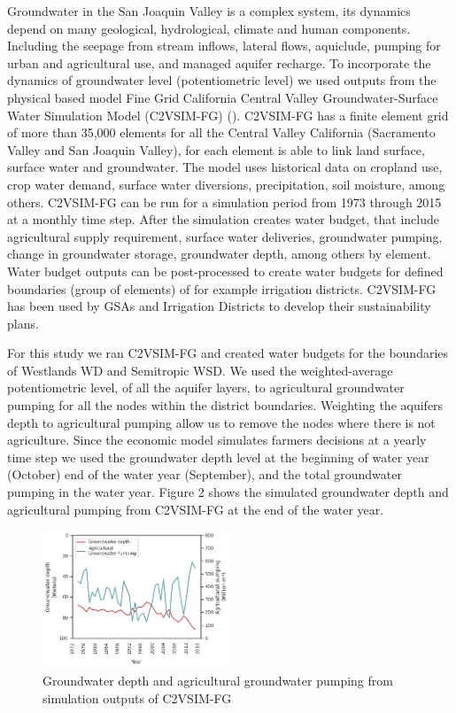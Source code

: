 \documentclass[11pt,a4paper]{article}
\begin{document}
Groundwater in the San Joaquin Valley is a complex system, its dynamics depend on many geological, hydrological, climate and human components. Including the seepage from stream inflows, lateral flows, aquiclude, pumping for urban and agricultural use, and managed aquifer recharge. To incorporate the dynamics of groundwater level (potentiometric level) we used outputs from the physical based model Fine Grid California Central Valley Groundwater-Surface Water Simulation Model (C2VSIM-FG) (\cite{brush_users_2013}). C2VSIM-FG has a finite element grid of more than 35,000 elements for all the Central Valley California (Sacramento Valley and San Joaquin Valley), for each element is able to link land surface, surface water and groundwater. The model uses historical data on cropland use, crop water demand, surface water diversions, precipitation, soil moisture, among others. C2VSIM-FG can be run for a simulation period from 1973 through 2015 at a monthly time step. After the simulation creates water budget, that include agricultural supply requirement, surface water deliveries, groundwater pumping, change in groundwater storage, groundwater depth, among others by element. Water budget outputs can be post-processed to create water budgets for defined boundaries (group of elements) of for example irrigation districts. C2VSIM-FG has been used by GSAs and Irrigation Districts to develop their sustainability plans.

For this study we ran C2VSIM-FG and created water budgets for the boundaries of Westlands WD and Semitropic WSD. We used the weighted-average potentiometric level, of all the aquifer layers, to agricultural groundwater pumping for all the nodes within the district boundaries. Weighting the aquifers depth to agricultural pumping allow us to remove the nodes where there is not agriculture. Since the economic model simulates farmers decisions at a yearly time step we used the groundwater depth level at the beginning of water year (October) end of the water year (September), and the total groundwater pumping in the water year. Figure 2 shows the simulated groundwater depth and agricultural pumping from C2VSIM-FG at the end of the water year. 

\begin{figure}[H]
    \centering
    \includegraphics[width=0.5\textwidth]{c2vsim_semitropic.png}
    \caption{Groundwater depth and agricultural groundwater pumping from simulation outputs of C2VSIM-FG}
    \label{fig:mes1h1}
\end{figure}
\end{document}
